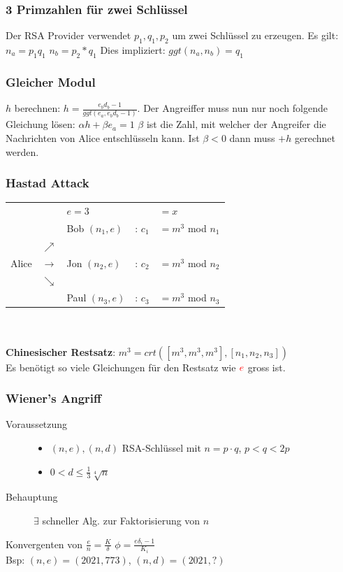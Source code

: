 \documentclass[landscape,twocolumn,a4paper]{article}
\newcommand{\Oneover}[1]{\frac{1}{#1}} %
\begin{document}
\subsubsection{3 Primzahlen für zwei Schlüssel}
Der RSA Provider verwendet $p_1, q_1, p_2$ um zwei Schlüssel zu erzeugen. Es gilt: $n_a = p_1 q_1$ $n_b = p_2*q_1$ Dies impliziert: $ggt(n_a, n_b) = q_1$
\subsubsection{Gleicher Modul}
$h$ berechnen: $ h = \frac{e_b d_b - 1}{ggt(e_a, e_b d_b -1)}$. Der
Angreiffer muss nun nur noch folgende Gleichung lösen: $\alpha h + \beta e_a = 1$ $\beta$ ist die Zahl, mit welcher der Angreifer die Nachrichten von Alice entschlüsseln kann. Ist $\beta < 0$ dann muss $+h$ gerechnet werden.
\subsubsection{Hastad Attack}
\begin{tabular}{l l l l l}
    & & {\color{red} $e=3$} & & $=x$ \\
	&  & Bob $(n_1,e)$ & : {\color{red}$c_1$} & $= m^3$ mod $n_1$\\
	&$\nearrow$  \\
	Alice & $\rightarrow$ & Jon $(n_2,e)$ & : {\color{red}$c_2$} & $= m^3$ mod $n_2$\\
	& $\searrow$ \\
	& & Paul $(n_3,e)$ & : {\color{red}$c_3$} & $= m^3$ mod $n_3$
\end{tabular} \\ \\
\textbf{Chinesischer Restsatz}: $m^3= crt([m^3,m^3,m^3],[n_1,n_2,n_3])$ \\
Es benötigt so viele Gleichungen für den Restsatz wie ${\color{red}e}$ gross ist.
\subsubsection{Wiener's Angriff}
\begin{description}
 \item [Voraussetzung] \hfill
    \begin{itemize}
      \item $(n,e),(n,d)$ RSA-Schlüssel mit $n=p\cdot q$, $p<q<2p$
      \item $0<d\leqslant\Oneover{3}\sqrt[4]{n}$
    \end{itemize}
 \item [Behauptung] $\exists$ schneller Alg. zur Faktorisierung von $n$
\end{description}
Konvergenten von $\frac{e}{n} = \frac{K}{\delta}$ $\phi = \frac{e \delta_{i}-1}{K_i}$\\
Bsp: $(n,e) = (2021, 773)$, $(n,d) = (2021, ?)$\\
\end{document}
